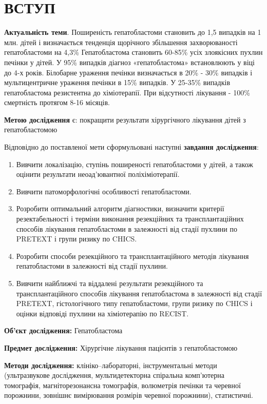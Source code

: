 \chapter{ВСТУП}
\textbf{Актуальність теми}. Поширеність гепатобластоми становить до 1,5 випадків на 1 млн. дітей і визначається тенденція щорічного збільшення захворюваності гепатобластоми на 4,3\% Гепатобластома становить 60-85\% усіх злоякісних пухлин печінки у дітей. У 95\% випадків діагноз «гепатобластома» встановлюють у віці до 4-х років. Білобарне ураження печінки визначається в 20\% - 30\% випадків і мультицентричне ураження печінки в 15\% випадків. У 25-35\% випадків гепатобластома резистентна до хіміотерапії. При відсутності лікування - 100\% смертність протягом 8-16 місяців.

\textbf{Метою дослідження} є: покращити результати хірургічного лікування дітей з гепатобластомою

Відповідно до поставленої мети сформульовані наступні \textbf{завдання дослідження}:
\begin{enumerate}
    \item Вивчити локалізацію, ступінь поширеності гепатобластоми у дітей, а також оцінити результати неоад'ювантної поліхіміотерапії.
    \item Вивчити патоморфологічні особливості гепатобластоми.
    \item Розробити оптимальний алгоритм діагностики, визначити критерії резектабельності і терміни виконання резекційних та трансплантаційних способів лікування гепатобластоми в залежності від стадії пухлини по PRETEXT і групи ризику по CHICS.
    \item Розробити способи резекційного та трансплантаційного методів лікування гепатобластоми в залежності від стадії пухлини.
    \item Вивчити найближчі та віддалені результати резекційного та трансплантаційного способів лікування гепатобластома в залежності від стадії PRETEXT, гістологічного типу гепатобластоми, групи ризику по CHICS і оцінки відповіді пухлини на хіміотерапію по RECIST.
    
\end{enumerate}


\textbf{Об’єкт дослідження:} Гепатобластома

\textbf{Предмет дослідження:} Хірургічне лікування пацієнтів з гепатобластомою

\textbf{Методи дослідження:} клініко–лабораторні, інструментальні методи (ультразвукове дослідження, мультидетекторна спіральна комп’ютерна томографія, магніторезонансна томографія, волюметрія печінки та черевної порожнини, зовнішнє вимірювання розмірів черевної порожнини), статистичні.


